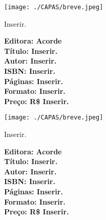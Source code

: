 \pagestyle{acorde}
\label{acorde}



\begin{center}
\hspace*{.5cm}\texttt{[image: ./CAPAS/breve.jpeg]}
\end{center}

\hspace*{-7cm}\hrulefill\hspace*{-7cm}

\medskip

\noindent{}Inserir.

\vfill

\hspace*{-.4cm}\begin{minipage}[c]{.5\linewidth}
\small\textbf{
\hspace*{-.1cm}Editora: Acorde\\
Título: Inserir.\\
Autor: Inserir.\\ 
ISBN: Inserir.\\
Páginas: Inserir.\\
Formato: Inserir.\\
Preço: R\$ Inserir.\\
}
\end{minipage}

\pagebreak

\begin{center}
\hspace*{.5cm}\texttt{[image: ./CAPAS/breve.jpeg]}
\end{center}

\hspace*{-7cm}\hrulefill\hspace*{-7cm}

\medskip

\noindent{}Inserir.

\vfill

\hspace*{-.4cm}\begin{minipage}[c]{.5\linewidth}
\small\textbf{
\hspace*{-.1cm}Editora: Acorde\\
Título: Inserir.\\
Autor: Inserir.\\ 
ISBN: Inserir.\\
Páginas: Inserir.\\
Formato: Inserir.\\
Preço: R\$ Inserir.\\
}
\end{minipage}

